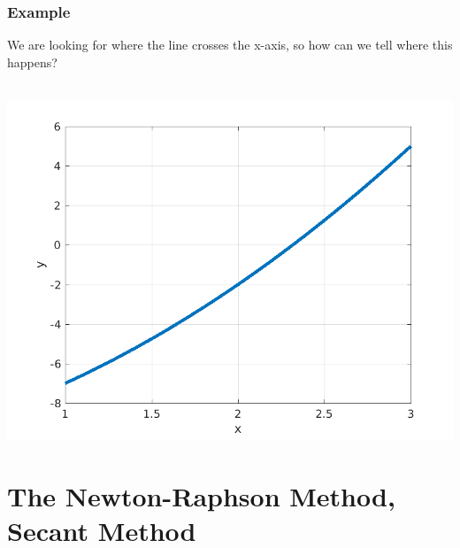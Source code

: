 \documentclass[fleqn]{beamer} %
\newcommand{\sectionIItitle}{The Newton-Raphson Method, Secant Method}
\newcommand{\sectionIsubsectionIVtitle}{Example}
\begin{document}
			\begin{frame}
				\frametitle{\sectionIsubsectionIVtitle}
				\bigskip

				We are looking for where the line crosses the x-axis, so how can we tell where this happens? \vspace{1mm}\\

				\begin{multicols}{2}
				 \vspace{3mm}\\

				\hspace*{-1cm}\includegraphics[scale=.4]{images/lecture1_fig3.png}
				\end{multicols}

				\btVFill
			\end{frame}
	
	\section{\sectionIItitle}\label{sectionII}
\end{document}
